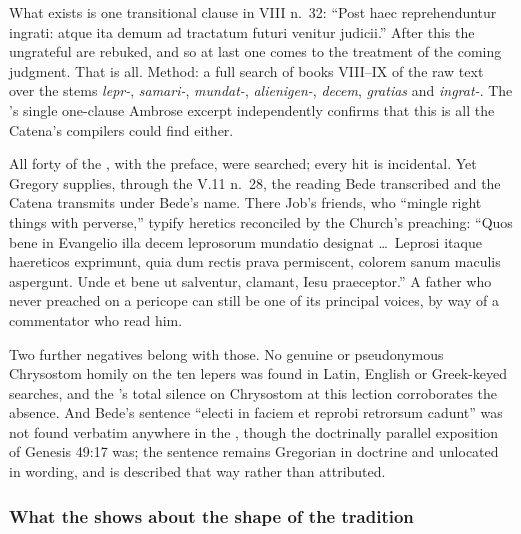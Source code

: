 \begin{witnessnote}
What exists is one transitional clause in  VIII n.~32: ``Post haec reprehenduntur ingrati: atque ita demum ad
tractatum futuri venitur judicii.'' After this the ungrateful are rebuked, and
so at last one comes to the treatment of the coming judgment. That is all.
Method: a full search of books VIII--IX of the raw text over the stems
\textit{lepr-}, \textit{samari-}, \textit{mundat-}, \textit{alienigen-},
\textit{decem}, \textit{gratias} and \textit{ingrat-}. The 's single one-clause Ambrose excerpt independently confirms that this is
all the Catena's compilers could find either.
\end{witnessnote}

\begin{witnessnote}
All forty of the , with the preface, were searched;
every hit is incidental. Yet Gregory supplies, through the  V.11 n.~28, the reading Bede transcribed and the Catena transmits under
Bede's name. There Job's friends, who ``mingle right things with perverse,''
typify heretics reconciled by the Church's preaching: ``Quos bene in Evangelio
illa decem leprosorum mundatio designat \dots\ Leprosi itaque haereticos
exprimunt, quia dum rectis prava permiscent, colorem sanum maculis
aspergunt. Unde et bene ut salventur, clamant, Iesu praeceptor.'' A father who
never preached on a pericope can still be one of its principal voices, by way
of a commentator who read him.
\end{witnessnote}

Two further negatives belong with those. No genuine or pseudonymous
Chrysostom homily on the ten lepers was found in Latin, English or Greek-keyed
searches, and the 's total silence on Chrysostom at this
lection corroborates the absence. And Bede's sentence ``electi in faciem et
reprobi retrorsum cadunt'' was not found verbatim anywhere in the
, though the doctrinally parallel exposition of Genesis 49:17
was; the sentence remains Gregorian in doctrine and unlocated in wording, and
is described that way rather than attributed.

\subsubsection*{What the  shows about the shape of the tradition}

